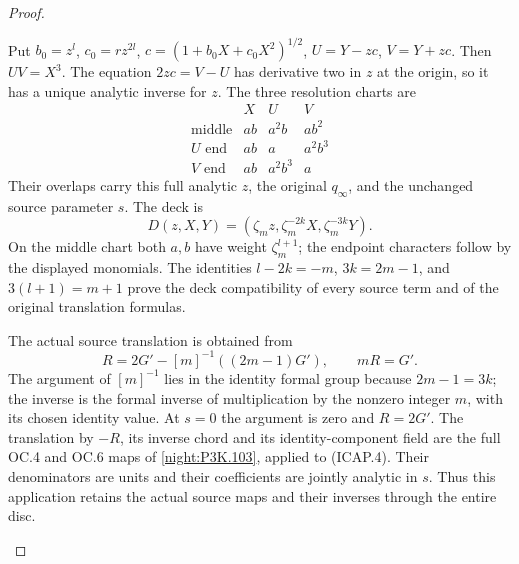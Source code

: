 \begin{proof}
\begin{enumerate}[label=\arabic*.]
Put \(b_0=z^l\), \(c_0=rz^{2l}\),
\(c=(1+b_0X+c_0X^2)^{1/2}\),
\(U=Y-zc\), \(V=Y+zc\). Then \(UV=X^3\).
The equation \(2zc=V-U\) has derivative two in \(z\) at
the origin, so it has a unique analytic inverse for \(z\).
The three resolution charts are
\[
\begin{array}{c|ccc}
 &X&U&V\\\hline
 \text{middle}&ab&a^2b&ab^2\\
 U\text{ end}&ab&a&a^2b^3\\
 V\text{ end}&ab&a^2b^3&a
\end{array}                                             \tag{ICAP.5}
\]
Their overlaps carry this full analytic \(z\), the original
\(q_\infty\), and the unchanged source parameter \(s\).
The deck is
\[
 D(z,X,Y)=(\zeta_mz,\zeta_m^{-2k}X,\zeta_m^{-3k}Y).
\]
On the middle chart both \(a,b\) have weight
\(\zeta_m^{l+1}\); the endpoint characters follow by the
displayed monomials. The identities
\(l-2k=-m\), \(3k=2m-1\), and
\(3(l+1)=m+1\) prove the deck compatibility of every source
term and of the original translation formulas.

The actual source translation is obtained from
\[
 R=2G'-[m]^{-1}((2m-1)G'),\qquad mR=G'.                 \tag{ICAP.6}
\]
The argument of \([m]^{-1}\) lies in the identity formal
group because \(2m-1=3k\); the inverse is the formal inverse
of multiplication by the nonzero integer \(m\), with its
chosen identity value. At \(s=0\) the argument is zero and
\(R=2G'\). The translation by \(-R\), its inverse chord
and its identity-component field are the full OC.4 and OC.6
maps of \cref{night:P3K.103}, applied to (ICAP.4).
Their denominators are units and their coefficients are jointly
analytic in \(s\). Thus this application retains the actual
source maps and their inverses through the entire disc.


\end{enumerate}
\end{proof}
